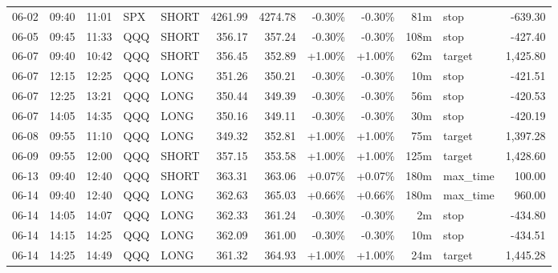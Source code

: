 \documentclass[11pt,a4paper,twoside]{article}
\begin{document}
\begin{center}
\begin{longtable}{>{\color{txtmain}}l l l l l r r r r r >{\color{txtmain}}l r}
06-02 & 09:40 & 11:01 & SPX & SHORT & 4261.99 & 4274.78 & \textcolor{lossred}{-0.30\%} & \textcolor{lossred}{-0.30\%} & 81m & stop & \textcolor{lossred}{-639.30} \\
06-05 & 09:45 & 11:33 & QQQ & SHORT & 356.17 & 357.24 & \textcolor{lossred}{-0.30\%} & \textcolor{lossred}{-0.30\%} & 108m & stop & \textcolor{lossred}{-427.40} \\
06-07 & 09:40 & 10:42 & QQQ & SHORT & 356.45 & 352.89 & \textcolor{wingreen}{+1.00\%} & \textcolor{wingreen}{+1.00\%} & 62m & target & \textcolor{wingreen}{1,425.80} \\
06-07 & 12:15 & 12:25 & QQQ & LONG & 351.26 & 350.21 & \textcolor{lossred}{-0.30\%} & \textcolor{lossred}{-0.30\%} & 10m & stop & \textcolor{lossred}{-421.51} \\
06-07 & 12:25 & 13:21 & QQQ & LONG & 350.44 & 349.39 & \textcolor{lossred}{-0.30\%} & \textcolor{lossred}{-0.30\%} & 56m & stop & \textcolor{lossred}{-420.53} \\
06-07 & 14:05 & 14:35 & QQQ & LONG & 350.16 & 349.11 & \textcolor{lossred}{-0.30\%} & \textcolor{lossred}{-0.30\%} & 30m & stop & \textcolor{lossred}{-420.19} \\
06-08 & 09:55 & 11:10 & QQQ & LONG & 349.32 & 352.81 & \textcolor{wingreen}{+1.00\%} & \textcolor{wingreen}{+1.00\%} & 75m & target & \textcolor{wingreen}{1,397.28} \\
06-09 & 09:55 & 12:00 & QQQ & SHORT & 357.15 & 353.58 & \textcolor{wingreen}{+1.00\%} & \textcolor{wingreen}{+1.00\%} & 125m & target & \textcolor{wingreen}{1,428.60} \\
06-13 & 09:40 & 12:40 & QQQ & SHORT & 363.31 & 363.06 & \textcolor{wingreen}{+0.07\%} & \textcolor{wingreen}{+0.07\%} & 180m & max\_time & \textcolor{wingreen}{100.00} \\
06-14 & 09:40 & 12:40 & QQQ & LONG & 362.63 & 365.03 & \textcolor{wingreen}{+0.66\%} & \textcolor{wingreen}{+0.66\%} & 180m & max\_time & \textcolor{wingreen}{960.00} \\
06-14 & 14:05 & 14:07 & QQQ & LONG & 362.33 & 361.24 & \textcolor{lossred}{-0.30\%} & \textcolor{lossred}{-0.30\%} & 2m & stop & \textcolor{lossred}{-434.80} \\
06-14 & 14:15 & 14:25 & QQQ & LONG & 362.09 & 361.00 & \textcolor{lossred}{-0.30\%} & \textcolor{lossred}{-0.30\%} & 10m & stop & \textcolor{lossred}{-434.51} \\
06-14 & 14:25 & 14:49 & QQQ & LONG & 361.32 & 364.93 & \textcolor{wingreen}{+1.00\%} & \textcolor{wingreen}{+1.00\%} & 24m & target & \textcolor{wingreen}{1,445.28} \\

\end{longtable}
\end{center}
\end{document}
